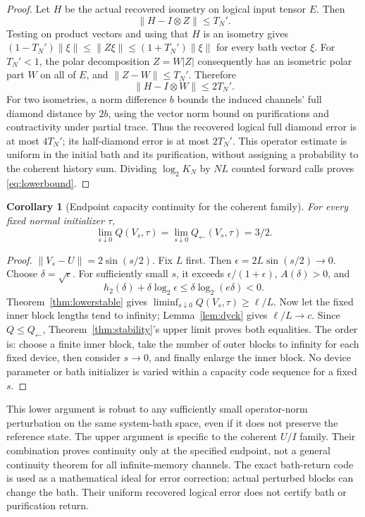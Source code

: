 \documentclass[11pt]{article}
\newtheorem{corollary}[theorem]{Corollary}
\newcommand{\norm}[1]{\lVert #1\rVert}
\begin{document}
\begin{proof}
Let $H$ be the actual recovered isometry on logical input tensor $E$. Then
\[
 \norm{H-I\otimes Z}\le T_N'.
\]
Testing on product vectors and using that $H$ is an isometry gives
$(1-T_N')\norm\xi\le\norm{Z\xi}\le(1+T_N')\norm\xi$ for every bath vector $\xi$.
For $T_N'<1$, the polar decomposition $Z=W|Z|$ consequently has an isometric polar part $W$ on all of $E$, and $\norm{Z-W}\le T_N'$. Therefore
\[
 \norm{H-I\otimes W}\le2T_N'.
\]
For two isometries, a norm difference $b$ bounds the induced channels' full diamond distance by $2b$, using the vector norm bound on purifications and contractivity under partial trace. Thus the recovered logical full diamond error is at most $4T_N'$; its half-diamond error is at most $2T_N'$. This operator estimate is uniform in the initial bath and its purification, without assigning a probability to the coherent history sum. Dividing $\log_2K_N$ by $NL$ counted forward calls proves \eqref{eq:lowerbound}.
\end{proof}

\begin{corollary}[Endpoint capacity continuity for the coherent family]\label{cor:continuity}
For every fixed normal initializer $\tau$,
\begin{equation}
 \lim_{s\downarrow0}Q(V_s,\tau)
 =\lim_{s\downarrow0}Q_{\leftarrow}(V_s,\tau)=3/2.\label{eq:continuity}
\end{equation}
\end{corollary}
\begin{proof}
$\norm{V_s-U}=2\sin(s/2)$. Fix $L$ first. Then $\epsilon=2L\sin(s/2)\to0$. Choose $\delta=\sqrt\epsilon$. For sufficiently small $s$, it exceeds $\epsilon/(1+\epsilon)$, $A(\delta)>0$, and
\[
 h_2(\delta)+\delta\log_2\epsilon
 \le\delta\log_2(e\delta)<0.
\]
Theorem~\ref{thm:lowerstable} gives $\liminf_{s\downarrow0}Q(V_s,\tau)\ge\ell/L$. Now let the fixed inner block lengths tend to infinity; Lemma~\ref{lem:dyck} gives $\ell/L\to c$. Since $Q\le Q_{\leftarrow}$, Theorem~\ref{thm:stability}'s upper limit proves both equalities. The order is: choose a finite inner block, take the number of outer blocks to infinity for each fixed device, then consider $s\to0$, and finally enlarge the inner block. No device parameter or bath initializer is varied within a capacity code sequence for a fixed $s$.
\end{proof}

This lower argument is robust to any sufficiently small operator-norm perturbation on the same system-bath space, even if it does not preserve the reference state. The upper argument is specific to the coherent $U/I$ family. Their combination proves continuity only at the specified endpoint, not a general continuity theorem for all infinite-memory channels. The exact bath-return code is used as a mathematical ideal for error correction; actual perturbed blocks can change the bath. Their uniform recovered logical error does not certify bath or purification return.
\end{document}
